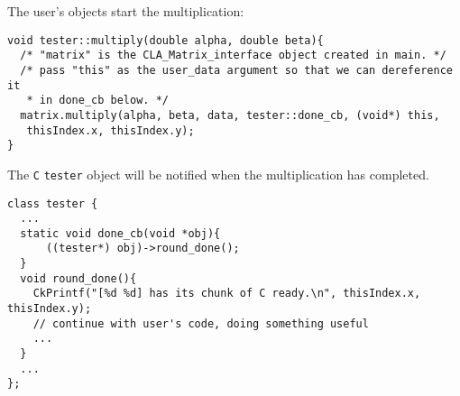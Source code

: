 The user's objects start the multiplication:
\begin{verbatim}
void tester::multiply(double alpha, double beta){
  /* "matrix" is the CLA_Matrix_interface object created in main. */
  /* pass "this" as the user_data argument so that we can dereference it
   * in done_cb below. */
  matrix.multiply(alpha, beta, data, tester::done_cb, (void*) this,
   thisIndex.x, thisIndex.y);
}
\end{verbatim}

The {\tt C} {\tt tester} object will be notified when the multiplication
has completed.
\begin{verbatim}
class tester {
  ...
  static void done_cb(void *obj){
      ((tester*) obj)->round_done();
  }
  void round_done(){
    CkPrintf("[%d %d] has its chunk of C ready.\n", thisIndex.x, thisIndex.y);
    // continue with user's code, doing something useful
    ...
  }
  ...
};
\end{verbatim}
